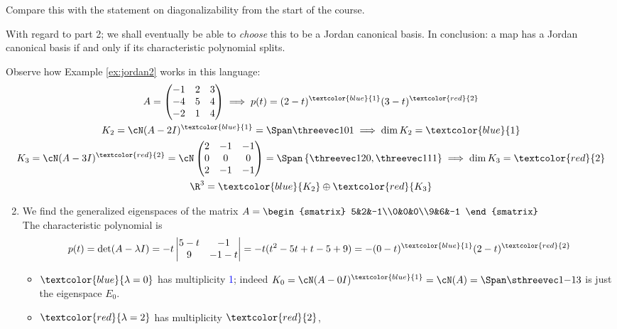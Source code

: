 Compare this with the statement on diagonalizability from the start of the course.\smallbreak

With regard to part 2; we shall eventually be able to \emph{choose} this to be a Jordan canonical basis. In conclusion: a map has a Jordan canonical basis if and only if its characteristic polynomial splits.



\begin{examples}{}{}
\exstart Observe how Example \ref{ex:jordan2} works in this language:
\begin{gather*}
A=\begin{pmatrix}
-1&2&3\\-4&5&4\\-2&1&4
\end{pmatrix}\implies p(t)=(2-t)^{\textcolor{blue}{1}}(3-t)^{\textcolor{red}{2}}\\
K_2=\cN(A-2I)^{\textcolor{blue}{1}}=\Span\threevec 101\implies\dim K_2={\textcolor{blue}{1}}\\
K_3=\cN(A-3I)^{\textcolor{red}{2}}=\cN\begin{pmatrix}
2&-1&-1\\0&0&0\\2&-1&-1
\end{pmatrix} =\Span\left\{\threevec 120,\threevec 111\right\}\implies\dim K_3={\textcolor{red}{2}}\\
\R^3=\textcolor{blue}{K_2}\oplus \textcolor{red}{K_3}
\end{gather*}
\begin{enumerate}\setcounter{enumi}{1}
  \item We find the generalized eigenspaces of the matrix $A=\begin{smatrix}
5&2&-1\\0&0&0\\9&6&-1
\end{smatrix}$\\
The characteristic polynomial is
\[p(t)=\det(A-\lambda I)=-t\begin{vmatrix}
5-t&-1\\9&-1-t
\end{vmatrix} =-t(t^2-5t+t-5+9)=-(0-t)^{\textcolor{blue}{1}}(2-t)^{\textcolor{red}{2}}\]
\begin{itemize}
  \item $\textcolor{blue}{\lambda=0}$ has multiplicity \textcolor{blue}{1}; indeed $K_0=\cN(A-0I)^{\textcolor{blue}{1}}=\cN(A)=\Span\sthreevec 1{-1}3$ is just the eigenspace $E_0$.
  \item $\textcolor{red}{\lambda=2}$ has multiplicity $\textcolor{red}{2}$,

\end{itemize}
\end{enumerate}
\end{examples}
